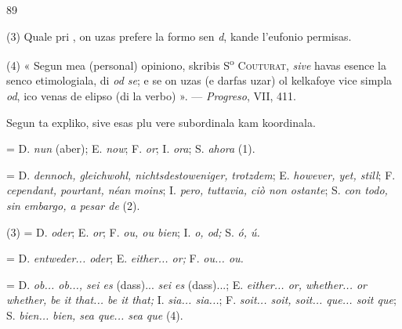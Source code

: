 \begin{VUpage}[93]{89}
{(3) Quale pri , on uzas prefere la formo sen \textit{d}, kande l'eufonio\nl
permisas.

(4) « Segun mea (personal) opiniono, skribis S\textsuperscript{o} \textsc{Couturat}, \textit{sive}\nl
havas esence la senco etimologiala, di \textit{od se}; e se on uzas (e darfas\nl
uzar) ol kelkafoye vice simpla \textit{od}, ico venas de elipso (di la verbo) ».\nl
--- \textit{Progreso}, VII, 411.

Segun ta expliko, sive esas plu vere subordinala kam koordinala.%
}

 = D. \textit{nun} (aber); E. \textit{now}; F. \textit{or}; I. \textit{ora}; S. \textit{ahora} (1).

 = D. \textit{dennoch, gleichwohl, nichtsdestoweniger,}\nl
\textit{trotzdem}; E. \textit{however, yet, still}; F. \textit{cependant, pourtant, néan}\cc
\textit{moins}; I. \textit{pero, tuttavia, ciò non ostante}; S. \textit{con todo, sin}\nl
\textit{embargo, a pesar de} (2).

 (3) = D. \textit{oder}; E. \textit{or}; F. \textit{ou, ou bien}; I. \textit{o, od;}\nl
S. \textit{ó, ú.}

 = D. \textit{entweder... oder}; E. \textit{either... or;}\nl
F. \textit{ou... ou.}

 = D. \textit{ob... ob..., sei es} (dass)... \textit{sei es} (dass)...;\nl
E. \textit{either... or, whether... or whether, be it that... be it that;}\nl
I. \textit{sia... sia...}; F. \textit{soit... soit, soit... que... soit que}; S. \textit{bien...}\nl
\textit{bien, sea que... sea que} (4).
\end{VUpage}

